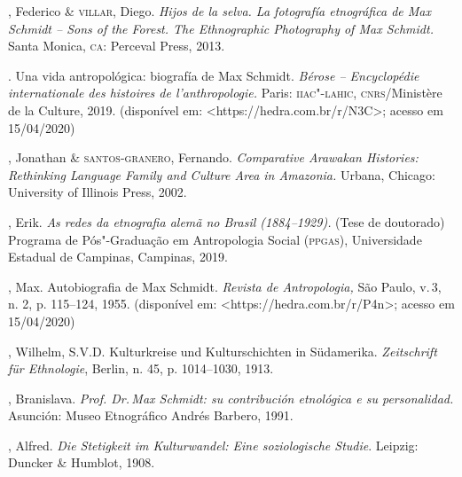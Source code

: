\begin{bibliohedra}
, Federico \& \textsc{villar}, Diego. \emph{Hijos de la selva. La
fotografía etnográfica de Max Schmidt -- Sons of the Forest. The
Ethnographic Photography of Max Schmidt.} Santa Monica, \textsc{ca}: Perceval
Press, 2013.

\titidem. Una vida antropológica: biografía de Max Schmidt.
\emph{Bérose -- Encyclopédie internationale des histoires de
l'anthropologie.} Paris: \textsc{iiac"-lahic}, \textsc{cnrs}/Ministère de la Culture, 2019.
(disponível em:
\textless{}https://hedra.com.br/r/N3C\textgreater{};
acesso em 15/04/2020)

, Jonathan \& \textsc{santos-granero}, Fernando. \emph{Comparative
Arawakan Histories: Rethinking Language Family and Culture Area in
Amazonia\emph{.}} Urbana, Chicago: University of Illinois Press, 2002.

, Erik. \emph{As redes da etnografia alemã no Brasil
(1884--1929).} (Tese de doutorado) Programa de Pós"-Graduação em
Antropologia Social (\textsc{ppgas}), Universidade Estadual de Campinas,
Campinas, 2019.

, Max. Autobiografia de Max Schmidt. \emph{Revista de
Antropologia,} São Paulo, v.\,3, n. 2, p. 115--124, 1955. (disponível em:
\textless{}https://hedra.com.br/r/P4n\textgreater{};
acesso em 15/04/2020)

, Wilhelm, S.V.D. Kulturkreise und Kulturschichten in Südamerika.
\emph{Zeitschrift für Ethnologie}, Berlin, n. 45, p. 1014--1030,
1913.

, Branislava. \emph{Prof. Dr.\,Max Schmidt: su contribución
etnológica e su personalidad.} Asunción: Museo Etnográfico Andrés
Barbero, 1991.

, Alfred. \emph{Die Stetigkeit im Kulturwandel: Eine
soziologische Studie}. Leipzig: Duncker \& Humblot, 1908.
\end{bibliohedra}